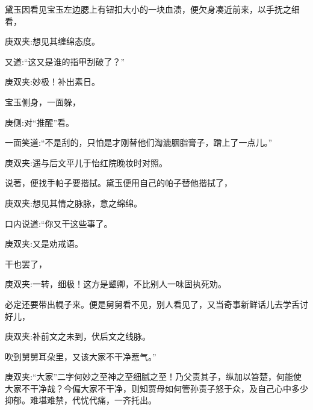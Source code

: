 \begin{parag}
    黛玉因看见宝玉左边腮上有钮扣大小的一块血渍，便欠身凑近前来，以手抚之细看，\begin{note}庚双夹:想见其缠绵态度。\end{note}又道:“这又是谁的指甲刮破了？”\begin{note}庚双夹:妙极！补出素日。\end{note}宝玉侧身，一面躲，\begin{note}庚侧:对“推醒”看。\end{note}一面笑道:“不是刮的，只怕是才刚替他们淘漉胭脂膏子，蹭上了一点儿。”\begin{note}庚双夹:遥与后文平儿于怡红院晚妆时对照。\end{note}说著，便找手帕子要揩拭。黛玉便用自己的帕子替他揩拭了，\begin{note}庚双夹:想见其情之脉脉，意之绵绵。\end{note}口内说道:“你又干这些事了。\begin{note}庚双夹:又是劝戒语。\end{note}干也罢了，\begin{note}庚双夹:一转，细极！这方是颦卿，不比别人一味固执死劝。\end{note}必定还要带出幌子来。便是舅舅看不见，别人看见了，又当奇事新鲜话儿去学舌讨好儿，\begin{note}庚双夹:补前文之未到，伏后文之线脉。\end{note}吹到舅舅耳朵里，又该大家不干净惹气。”\begin{note}庚双夹:“大家”二字何妙之至神之至细腻之至！乃父责其子，纵加以笞楚，何能使大家不干净哉？今偏大家不干净，则知贾母如何管孙责子怒于众，及自己心中多少抑郁。难堪难禁，代忧代痛，一齐托出。\end{note}
\end{parag}


